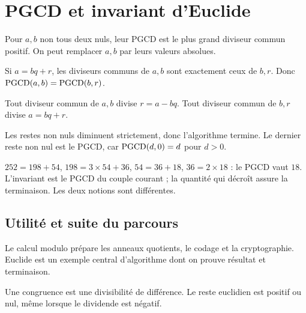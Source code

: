 \documentclass[../cours_tle.tex]{subfiles}
\begin{document}
\section{PGCD et invariant d'Euclide}
Pour $a,b$ non tous deux nuls, leur PGCD est le plus grand diviseur commun positif. On peut remplacer $a,b$ par leurs valeurs absolues.
\begin{propriete}
Si $a=bq+r$, les diviseurs communs de $a,b$ sont exactement ceux de $b,r$. Donc $\operatorname{PGCD}(a,b)=\operatorname{PGCD}(b,r)$.
\end{propriete}
\begin{demonstration}
Tout diviseur commun de $a,b$ divise $r=a-bq$. Tout diviseur commun de $b,r$ divise $a=bq+r$.
\end{demonstration}
Les restes non nuls diminuent strictement, donc l'algorithme termine. Le dernier reste non nul est le PGCD, car $\operatorname{PGCD}(d,0)=d$ pour $d>0$.
\begin{exemple}
$252=198+54$, $198=3\times54+36$, $54=36+18$, $36=2\times18$ : le PGCD vaut $18$.
L'invariant est le PGCD du couple courant ; la quantité qui décroît assure la terminaison. Les deux notions sont différentes.
\end{exemple}
\begin{finchapitre}
\section{Utilité et suite du parcours}
Le calcul modulo prépare les anneaux quotients, le codage et la cryptographie. Euclide est un exemple central d'algorithme dont on prouve résultat et terminaison.
\begin{retenir}
Une congruence est une divisibilité de différence. Le reste euclidien est positif ou nul, même lorsque le dividende est négatif.
\end{retenir}
\end{finchapitre}
\end{document}
